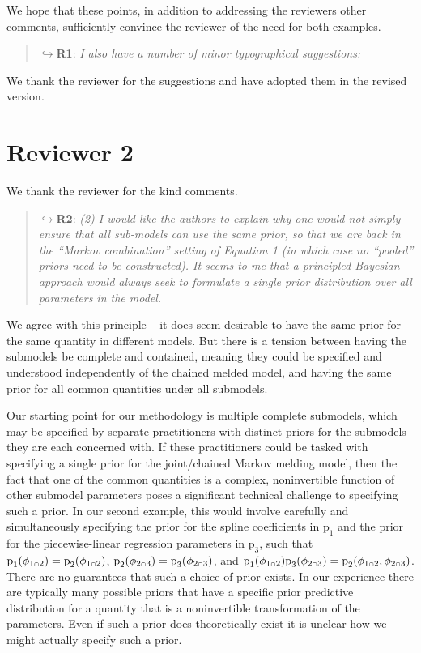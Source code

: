 \documentclass[
  10pt,
  a4paper,
]{article}
\let\Oldcap\cap
\renewcommand{\cap}{\mathrel{\mathsmaller{\Oldcap}}}
\newcommand{\pd}{\text{p}}
\begin{document}
We hope that these points, in addition to addressing the reviewers other
comments, sufficiently convince the reviewer of the need for both
examples.

\begin{quote}
\(\hookrightarrow\)\textbf{R1}: \emph{I also have a number of minor
typographical suggestions:}
\end{quote}

We thank the reviewer for the suggestions and have adopted them in the
revised version.

\hypertarget{reviewer-2}{%
\section*{Reviewer 2}\label{reviewer-2}}

We thank the reviewer for the kind comments.

\begin{quote}
\(\hookrightarrow\)\textbf{R2}: \emph{(2) I would like the authors to
explain why one would not simply ensure that all sub-models can use the
same prior, so that we are back in the ``Markov combination'' setting of
Equation 1 (in which case no ``pooled'' priors need to be constructed).
It seems to me that a principled Bayesian approach would always seek to
formulate a single prior distribution over all parameters in the model.}
\end{quote}

We agree with this principle -- it does seem desirable to have the same
prior for the same quantity in different models. But there is a tension
between having the submodels be complete and contained, meaning they
could be specified and understood independently of the chained melded
model, and having the same prior for all common quantities under all
submodels.

Our starting point for our methodology is multiple complete submodels,
which may be specified by separate practitioners with distinct priors
for the submodels they are each concerned with. If these practitioners
could be tasked with specifying a single prior for the joint/chained
Markov melding model, then the fact that one of the common quantities is
a complex, noninvertible function of other submodel parameters poses a
significant technical challenge to specifying such a prior. In our
second example, this would involve carefully and simultaneously
specifying the prior for the spline coefficients in \(\pd_{1}\) and the
prior for the piecewise-linear regression parameters in \(\pd_{3}\),
such that \(\pd_{1}(\phi_{1 \cap 2}) = \pd_{2}(\phi_{1 \cap 2})\),
\(\pd_{2}(\phi_{2 \cap 3}) = \pd_{3}(\phi_{2 \cap 3})\), and
\(\pd_{1}(\phi_{1 \cap 2})\pd_{3}(\phi_{2 \cap 3}) = \pd_{2}(\phi_{1 \cap 2}, \phi_{2 \cap 3})\).
There are no guarantees that such a choice of prior exists. In our
experience there are typically many possible priors that have a specific
prior predictive distribution for a quantity that is a noninvertible
transformation of the parameters. Even if such a prior does
theoretically exist it is unclear how we might actually specify such a
prior.
\end{document}
